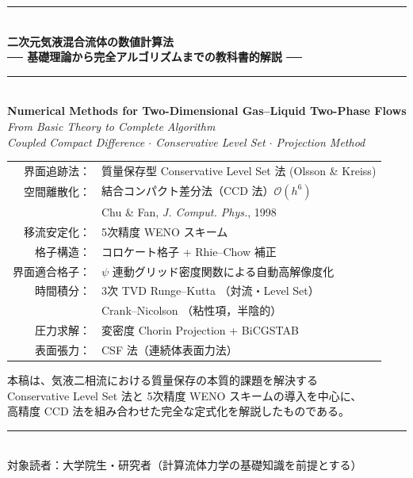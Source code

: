 \documentclass[12pt, a4paper, titlepage, xelatex, ja=standard]{bxjsarticle}
\newcommand{\Ord}[1]{\mathcal{O}(#1)}
\begin{document}
\RaggedRight

\begin{titlepage}
\begin{center}
\vspace*{12mm}
{\color{navy}\rule{\linewidth}{2pt}}\\[8pt]
{\LARGE\bfseries 二次元気液混合流体の数値計算法}\\[6pt]
{\large\bfseries ── 基礎理論から完全アルゴリズムまでの教科書的解説 ──}\\[4pt]
{\color{navy}\rule{\linewidth}{2pt}}\\[10pt]

{\large
\textbf{Numerical Methods for Two-Dimensional Gas--Liquid Two-Phase Flows}\\[4pt]
\textit{From Basic Theory to Complete Algorithm}\\[3pt]
\textit{Coupled Compact Difference $\cdot$ Conservative Level Set $\cdot$ Projection Method}
}

\vspace{18mm}
\begin{tcolorbox}[defbox, width=0.85\textwidth]
\small\centering
\begin{tabular}{rl}
界面追跡法： & 質量保存型 Conservative Level Set 法 (Olsson \& Kreiss)\\[2pt]
空間離散化： & 結合コンパクト差分法（CCD 法）$\Ord{h^6}$\\
                  & Chu \& Fan, \textit{J. Comput. Phys.}, 1998\\[2pt]
移流安定化： & 5次精度 WENO スキーム\\[2pt]
格子構造：   & コロケート格子 + Rhie--Chow 補正\\[2pt]
界面適合格子： & $\psi$ 連動グリッド密度関数による自動高解像度化\\[2pt]
時間積分：   & 3次 TVD Runge--Kutta （対流・Level Set）\\
                  & Crank--Nicolson （粘性項，半陰的）\\[2pt]
圧力求解：   & 変密度 Chorin Projection + BiCGSTAB\\[2pt]
表面張力：   & CSF 法（連続体表面力法）
\end{tabular}
\end{tcolorbox}

\vspace{10mm}
{\small\color{darkgray}
本稿は、気液二相流における質量保存の本質的課題を解決する\\
Conservative Level Set 法と 5次精度 WENO スキームの導入を中心に、\\
高精度 CCD 法を組み合わせた完全な定式化を解説したものである。
}
\end{center}

\vfill
{\color{navy}\rule{\linewidth}{0.8pt}}\\[2pt]
{\small\color{darkgray}対象読者：大学院生・研究者（計算流体力学の基礎知識を前提とする）}
\end{titlepage}
\end{document}
